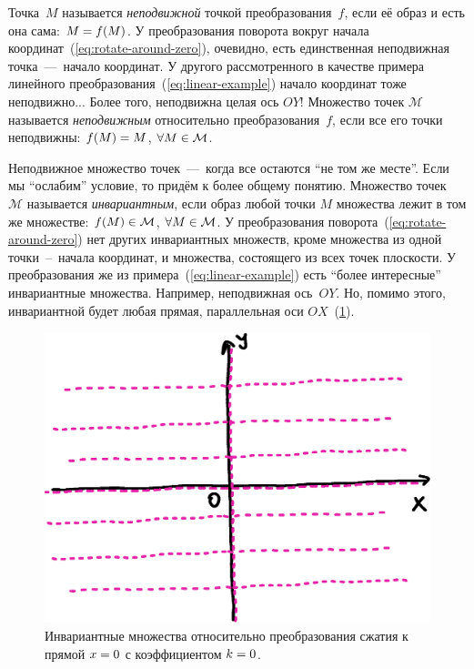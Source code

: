 \documentclass[a4paper,12pt]{article}
\begin{document}
  Точка~$M$ называется \emph{неподвижной} точкой преобразования~$f$, если её образ и есть она сама: $M \hm= f(M)$.
  У преобразования поворота вокруг начала координат~(\ref{eq:rotate-around-zero}), очевидно, есть единственная неподвижная точка~---~начало координат.
  У другого рассмотренного в качестве примера линейного преобразования~(\ref{eq:linear-example}) начало координат тоже неподвижно...
  Более того, неподвижна целая ось $OY$!
  Множество точек $\mathcal M$ называется \emph{неподвижным} относительно преобразования~$f$, если все его точки неподвижны: $f(M) \hm= M$, $\forall M \hm\in \mathcal M$.
  
  Неподвижное множество точек~---~когда все остаются ``не том же месте''.
  Если мы ``ослабим'' условие, то придём к более общему понятию.
  Множество точек~$\mathcal M$ называется \emph{инвариантным}, если образ любой точки $M$ множества лежит в том же множестве: $f(M) \hm\in \mathcal M$, $\forall M \hm\in \mathcal M$.
  У преобразования поворота~(\ref{eq:rotate-around-zero}) нет других инвариантных множеств, кроме множества из одной точки~--~начала координат, и множества, состоящего из всех точек плоскости.
  У преобразования же из примера~(\ref{eq:linear-example}) есть ``более интересные'' инвариантные множества.
  Например, неподвижная ось~$OY$.
  Но, помимо этого, инвариантной будет любая прямая, параллельная оси $OX$~(\ref{fig:linear-example-inv}).
  
  \begin{figure}
      \centering
      
      \includegraphics[width=0.6\columnwidth]{linear-example-inv}
      
      \caption{Инвариантные множества относительно преобразования сжатия к прямой $x \hm= 0$ с коэффициентом $k \hm= 0$.}
      \label{fig:linear-example-inv}
    \end{figure}
  
\end{document}
